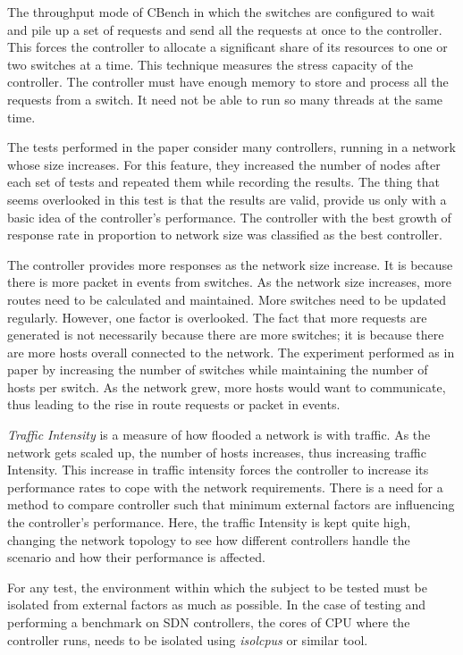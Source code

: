     The throughput mode of CBench in which the switches are configured to wait and pile up a set of requests and send all the requests at once to the controller. This forces the controller to allocate a significant share of its resources to one or two switches at a time. This technique measures the stress capacity of the controller. The controller must have enough memory to store and process all the requests from a switch. It need not be able to run so many threads at the same time.

    The tests performed in the paper \cite{dynamicrouting} consider many controllers, running in a network whose size increases. For this feature, they increased the number of nodes after each set of tests and repeated them while recording the results. The thing that seems overlooked in this test is that the results are valid, provide us only with a basic idea of the controller's performance. The controller with the best growth of response rate in proportion to network size was classified as the best controller.
        
    The controller provides more responses as the network size increase. It is because there is more packet in events from switches. As the network size increases, more routes need to be calculated and maintained. More switches need to be updated regularly. However, one factor is overlooked. The fact that more requests are generated is not necessarily because there are more switches; it is because there are more hosts overall connected to the network. The experiment performed as in paper \cite{routingtie2017} by increasing the number of switches while maintaining the number of hosts per switch. As the network grew, more hosts would want to communicate, thus leading to the rise in route requests or packet in events.
    
    \textit{Traffic Intensity} is a measure of how flooded a network is with traffic. As the network gets scaled up, the number of hosts increases, thus increasing traffic Intensity. This increase in traffic intensity forces the controller to increase its performance rates to cope with the network requirements. There is a need for a method to compare controller such that minimum external factors are influencing the controller's performance. Here, the traffic Intensity is kept quite high, changing the network topology to see how different controllers handle the scenario and how their performance is affected.

    For any test, the environment within which the subject to be tested must be isolated from external factors as much as possible. In the case of testing and performing a benchmark on SDN controllers, the cores of CPU where the controller runs, needs to be isolated using \textit{isolcpus} or similar tool.